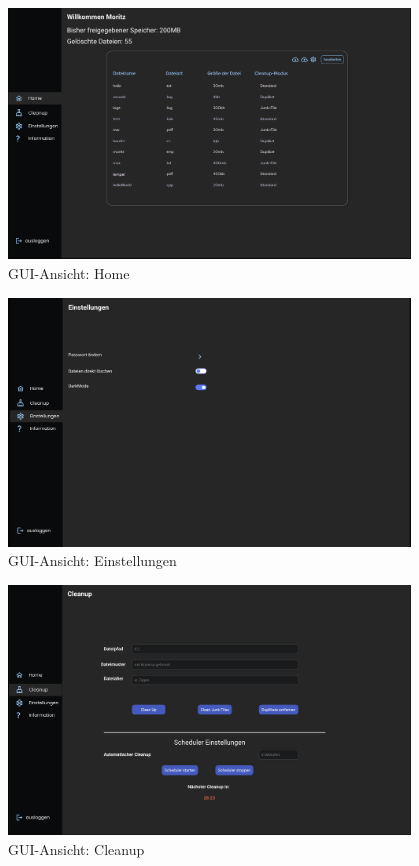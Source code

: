\begin{figure}[H]
    \centering
    \includegraphics[width=0.95\textwidth]{src/mockup_ui_home.png}
    \caption{GUI-Ansicht: Home}
    \label{fig:gui-home}
\end{figure}

\begin{figure}[H]
    \centering
    \includegraphics[width=0.95\textwidth]{src/mockup_ui_settings.png}
    \caption{GUI-Ansicht: Einstellungen}
    \label{fig:gui-settings}
\end{figure}

\begin{figure}[H]
    \centering
    \includegraphics[width=0.95\textwidth]{src/mockup_ui_cleanup.png}
    \caption{GUI-Ansicht: Cleanup}
    \label{fig:gui-cleanup}
\end{figure}

